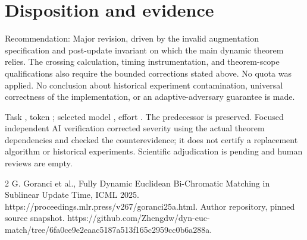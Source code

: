 \documentclass[10pt]{article}
\begin{document}
\section*{Disposition and evidence}
Recommendation: Major revision, driven by the invalid augmentation specification and post-update invariant on which the main dynamic theorem relies. The crossing calculation, timing instrumentation, and theorem-scope qualifications also require the bounded corrections stated above. No quota was applied. No conclusion about historical experiment contamination, universal correctness of the implementation, or an adaptive-adversary guarantee is made.\par
Task , token ; selected model , effort . The predecessor is preserved. Focused independent AI verification corrected severity using the actual theorem dependencies and checked the counterevidence; it does not certify a replacement algorithm or historical experiments. Scientific adjudication is pending and human reviews are empty.\par
2 G. Goranci et al., Fully Dynamic Euclidean Bi-Chromatic Matching in Sublinear Update Time, ICML 2025. https://proceedings.mlr.press/v267/goranci25a.html. Author repository, pinned source snapshot. https://github.com/Zhengdw/dyn-euc-match/tree/6fa0ce9e2eaac5187a513f165c2959cc0b6a288a.\par
\end{document}

